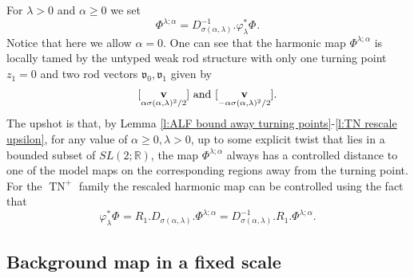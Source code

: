 \documentclass[a4paper,11pt]{amsart}
\theoremstyle{definition}
\numberwithin{equation}{section}
\newcommand{\R}{\mathbb{R}}
\newcommand{\mv} {\mathfrak v}
\DeclareMathOperator{\bv}{{\bf v}}
\DeclareMathOperator{\TN}{TN}
\DeclareMathOperator{\TNap}{TN^+_\alpha}
\DeclareMathOperator{\TNam}{TN^{--}_\alpha}
\begin{document}
For $\lambda>0$  and $\alpha\geq0$
we set 
\begin{equation}\label{eq:scaling relation for TN}
	\Phi^{\lambda; \alpha}=	
     D_{\sigma(\alpha,\lambda)}^{-1}.\varphi_{\lambda}^*\Phi^{\TNam}.
	\end{equation}
Notice that here we allow $\alpha=0$. One can see that the harmonic map $\Phi^{\lambda;\alpha}$ is locally tamed by the untyped weak rod structure with only one turning point $z_1=0$ and two rod vectors $\mv_0,\mv_1$ given by
\begin{align}\label{eq:lambda;alpha rod vector 1}
    [\bv_{\alpha\sigma(\alpha,\lambda)^2/2}]\text{ and }[\bv_{-\alpha\sigma(\alpha,\lambda)^2/2}].
\end{align}
The upshot is that, by Lemma \ref{l:ALF bound away turning points}-\ref{l:TN rescale upsilon}, for any value of $\alpha\geq0,\lambda>0$, up to some explicit twist that lies in a bounded subset of $SL(2;\R)$, the map $\Phi^{\lambda;\alpha}$ always has a controlled distance to one of the model maps on the corresponding regions away from the turning point.
For the $\TN^+$ family the rescaled harmonic map can be controlled using the fact that 
\begin{equation}\label{eq:rescaling relation for TN+}
    \varphi_{\lambda}^*\Phi^{\TNap}=R_1.D_{\sigma(\alpha,\lambda)}.\Phi^{\lambda;\alpha}=D_{\sigma(\alpha,\lambda)}^{-1}.R_1.\Phi^{\lambda;\alpha}.
\end{equation}




\subsection{Background map in a fixed scale}
\label{ss:background map in a fixed scale}
\end{document}
